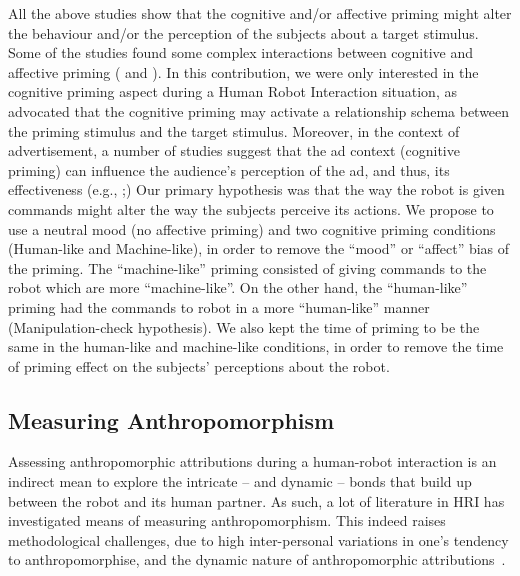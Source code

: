 \documentclass[lettersize, noapacite, twoside, HRI]{apa_HRI}
\begin{document}
All the above studies show that the cognitive and/or affective priming might
alter the behaviour and/or the perception of the subjects about a target
stimulus. Some of the studies found some complex interactions between cognitive
and affective priming (\cite{yi1990cognitive} and \cite{storbeck2008affective}
). In this contribution, we were only interested in the cognitive priming aspect
during a Human Robot Interaction situation, as \cite{baldwin1990priming}
advocated that the cognitive priming may activate a relationship schema between
the priming stimulus and the target stimulus. Moreover, in the context of
advertisement, a number of studies suggest that the ad context (cognitive
priming) can influence the audience's perception of the ad, and thus, its
effectiveness (e.g., \cite{singh1987arousal};\cite{soldow1981response})  Our
primary hypothesis was that the way the robot is given commands might alter the
way the subjects perceive its actions. We propose to use a neutral mood (no
affective priming) and two cognitive priming conditions (Human-like and
Machine-like), in order to remove the ``mood'' or  ``affect'' bias of the
priming. The ``machine-like'' priming consisted of giving commands to the robot
which are more ``machine-like''. On the other hand, the ``human-like'' priming
had the commands to robot in a more ``human-like'' manner (Manipulation-check
hypothesis). We also kept the time of priming to be the same in the human-like
and machine-like conditions, in order to remove the time of priming effect on
the subjects' perceptions about the robot. 


\subsection{Measuring Anthropomorphism}

Assessing anthropomorphic attributions during a human-robot interaction is an
indirect mean to explore the intricate -- and dynamic -- bonds that build up
between the robot and its human partner. As such, a lot of literature in HRI has
investigated means of measuring anthropomorphism. This indeed raises 
methodological challenges, due to high inter-personal variations in
one's tendency to anthropomorphise, and the dynamic nature of
anthropomorphic attributions~\citep{lemaignan2014dynamics}.
\end{document}
